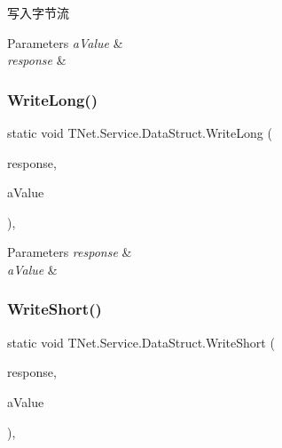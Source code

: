 写入字节流 


\begin{DoxyParams}{Parameters}
{\em a\+Value} & \\
\hline
{\em response} & \\
\hline
\end{DoxyParams}
\mbox{\label{class_t_net_1_1_service_1_1_data_struct_a81c8878685f305745bac43b205098b09}} 
\subsubsection{\texorpdfstring{Write\+Long()}{WriteLong()}}
{\footnotesize\ttfamily static void T\+Net.\+Service.\+Data\+Struct.\+Write\+Long (\begin{DoxyParamCaption}\item[{\mbox{\hyperlink{class_t_net_1_1_service_1_1_base_game_response}{Base\+Game\+Response}}}]{response,  }\item[{Int64}]{a\+Value }\end{DoxyParamCaption})\hspace{0.3cm}{\ttfamily [static]}, {\ttfamily [protected]}}






\begin{DoxyParams}{Parameters}
{\em response} & \\
\hline
{\em a\+Value} & \\
\hline
\end{DoxyParams}
\mbox{\label{class_t_net_1_1_service_1_1_data_struct_adb0cd7ce8fac39a7609c71bd9962d615}} 
\subsubsection{\texorpdfstring{Write\+Short()}{WriteShort()}}
{\footnotesize\ttfamily static void T\+Net.\+Service.\+Data\+Struct.\+Write\+Short (\begin{DoxyParamCaption}\item[{\mbox{\hyperlink{class_t_net_1_1_service_1_1_base_game_response}{Base\+Game\+Response}}}]{response,  }\item[{Int16}]{a\+Value }\end{DoxyParamCaption})\hspace{0.3cm}{\ttfamily [static]}, {\ttfamily [protected]}}



